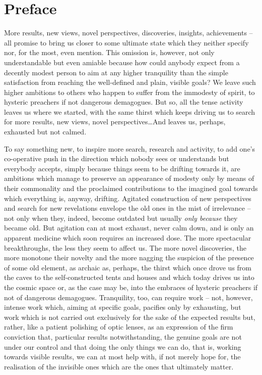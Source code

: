 \section*{Preface}

More results, new views, novel perspectives, discoveries, insights, achievements
-- all promise to bring us closer to some ultimate state which they neither
specify nor, for the most, even mention. This omission is, however, not only
understandable but even amiable because how could anybody expect from a decently
modest person to aim at any higher tranquility than the simple satisfaction from
reaching the well-defined and plain, visible goals? We leave such higher
ambitions to others who happen to suffer from the immodesty of spirit, to
hysteric preachers if not dangerous demagogues.  But so, all the tense activity
leaves us where we started, with the same thirst which keeps driving us to
search for more results, new views, novel perspectives\ldots And leaves us,
perhaps, exhausted but not calmed.

To say something new, to inspire more
search, research and activity, to add one's co-operative push in the direction
which nobody sees or understands but everybody accepts, simply because things seem to be
drifting towards it, are ambitions which manage to preserve an appearance of
modesty only by means of their commonality and the proclaimed contributions to the
imagined goal towards which everything is, anyway, drifting.
Agitated construction of new perspectives and search for new revelations envelope the old
ones in the mist of irrelevance -- not only when they, indeed, become outdated
but usually {\em only because} they became old.
%
But agitation can at most exhaust, never calm down, and is only an apparent
medicine which soon requires an increased dose. 
The more spectacular breakthroughs, the less they seem to affect us. The more
novel discoveries, the more monotone their novelty and the more nagging the
suspicion of the presence of some 
old element, as archaic as, perhaps, the
thirst which once drove us from the caves to the self-constructed tents and
houses and which today drives us into the cosmic space or, as the case may be,
into the embraces of hysteric preachers if not of dangerous demagogues.
Tranquility, too, can require work -- not, however, intense work which, aiming at
specific goals, pacifies only by exhausting, but work which is not carried out
exclusively for the sake of the expected results but, rather, like a patient
polishing of optic lenses, as an expression
of the firm conviction that, particular results notwithstanding, the genuine
goals are not under our control and that doing the only things we can do, that
is, working towards visible results, we can at most help with, if not merely hope
for, the realisation of the invisible ones which are the ones that ultimately matter.

